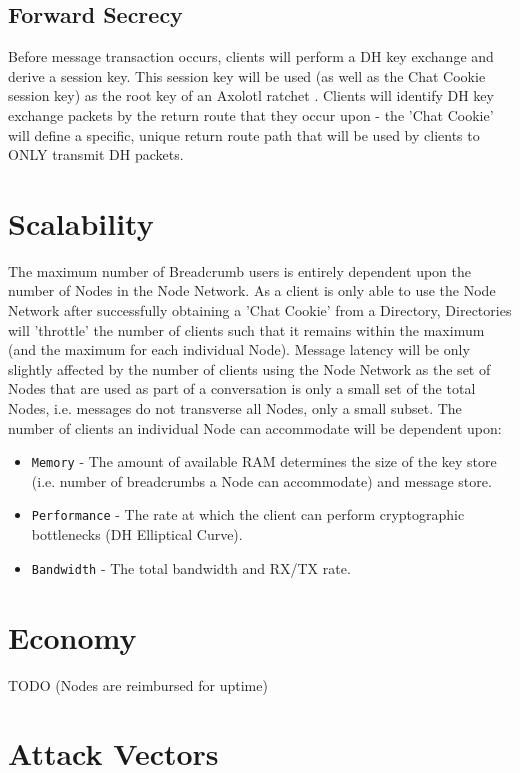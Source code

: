 \documentclass{article}
\begin{document}
\subsection{Forward Secrecy}
Before message transaction occurs, clients will perform a DH key exchange and derive a session key. This session key will be used (as well as the Chat Cookie session key) as the root key of an Axolotl ratchet \cite{OwsRatchet,AxoRatchetLib}. Clients will identify DH key exchange packets by the return route that they occur upon - the 'Chat Cookie' will define a specific, unique return route path that will be used by clients to ONLY transmit DH packets.

\newpage

\section{Scalability}
The maximum number of Breadcrumb users is entirely dependent upon the number of Nodes in the Node Network. As a client is only able to use the Node Network after successfully obtaining a 'Chat Cookie' from a Directory, Directories will 'throttle' the number of clients such that it remains within the maximum (and the maximum for each individual Node). Message latency will be only slightly affected by the number of clients using the Node Network as the set of Nodes that are used as part of a conversation is only a small set of the total Nodes, i.e. messages do not transverse all Nodes, only a small subset.
The number of clients an individual Node can accommodate will be dependent upon:
\begin{itemize}
	\item \texttt{Memory} - The amount of available RAM determines the size of the key store (i.e. number of breadcrumbs a Node can accommodate) and message store.
	\item \texttt{Performance} - The rate at which the client can perform cryptographic bottlenecks (DH Elliptical Curve).
	\item \texttt{Bandwidth} - The total bandwidth and RX/TX rate.
\end{itemize}

\section{Economy}
TODO (Nodes are reimbursed for uptime)

\newpage

\section{Attack Vectors}
\end{document}
